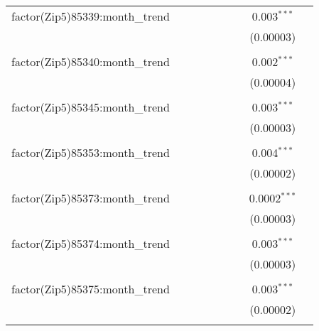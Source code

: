 \begin{table}[H]
{\begin{tabular}{@{\extracolsep{5pt}}lcccccccc}
  factor(Zip5)85339:month\_trend &  &  &  &  &  &  & 0.003$^{***}$ &  \\  

   &  &  &  &  &  &  & (0.00003) &  \\  

   & & & & & & & & \\  

  factor(Zip5)85340:month\_trend &  &  &  &  &  &  & 0.002$^{***}$ &  \\  

   &  &  &  &  &  &  & (0.00004) &  \\  

   & & & & & & & & \\  

  factor(Zip5)85345:month\_trend &  &  &  &  &  &  & 0.003$^{***}$ &  \\  

   &  &  &  &  &  &  & (0.00003) &  \\  

   & & & & & & & & \\  

  factor(Zip5)85353:month\_trend &  &  &  &  &  &  & 0.004$^{***}$ &  \\  

   &  &  &  &  &  &  & (0.00002) &  \\  

   & & & & & & & & \\  

  factor(Zip5)85373:month\_trend &  &  &  &  &  &  & 0.0002$^{***}$ &  \\  

   &  &  &  &  &  &  & (0.00003) &  \\  

   & & & & & & & & \\  

  factor(Zip5)85374:month\_trend &  &  &  &  &  &  & 0.003$^{***}$ &  \\  

   &  &  &  &  &  &  & (0.00003) &  \\  

   & & & & & & & & \\  

  factor(Zip5)85375:month\_trend &  &  &  &  &  &  & 0.003$^{***}$ &  \\  

   &  &  &  &  &  &  & (0.00002) &  \\  

   & & & & & & & & \\  


\end{tabular}}
\end{table}
